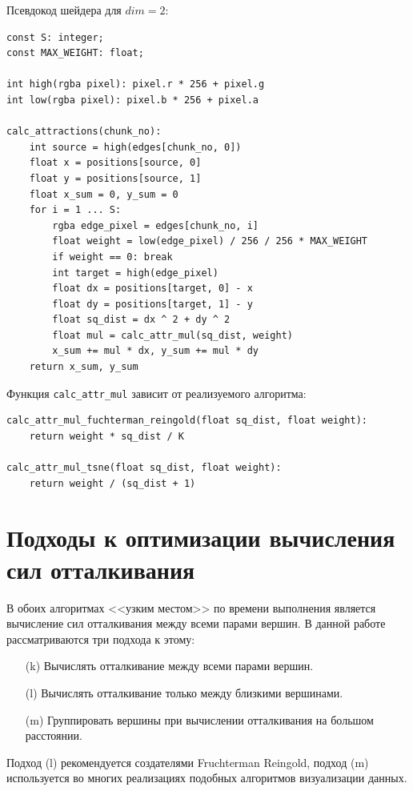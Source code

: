 Псевдокод шейдера для $dim = 2$:

\begin{verbatim}
const S: integer;
const MAX_WEIGHT: float;

int high(rgba pixel): pixel.r * 256 + pixel.g
int low(rgba pixel): pixel.b * 256 + pixel.a

calc_attractions(chunk_no):
    int source = high(edges[chunk_no, 0])
    float x = positions[source, 0]
    float y = positions[source, 1]
    float x_sum = 0, y_sum = 0
    for i = 1 ... S:
        rgba edge_pixel = edges[chunk_no, i]
        float weight = low(edge_pixel) / 256 / 256 * MAX_WEIGHT
        if weight == 0: break
        int target = high(edge_pixel)
        float dx = positions[target, 0] - x
        float dy = positions[target, 1] - y
        float sq_dist = dx ^ 2 + dy ^ 2
        float mul = calc_attr_mul(sq_dist, weight)
        x_sum += mul * dx, y_sum += mul * dy
    return x_sum, y_sum
\end{verbatim}

Функция \texttt{calc\_attr\_mul} зависит от реализуемого алгоритма:

\begin{verbatim}
calc_attr_mul_fuchterman_reingold(float sq_dist, float weight):
    return weight * sq_dist / K

calc_attr_mul_tsne(float sq_dist, float weight):
    return weight / (sq_dist + 1)
\end{verbatim}

\section{Подходы к оптимизации вычисления сил отталкивания}


В обоих алгоритмах <<узким местом>> по времени выполнения является вычисление сил отталкивания между всеми парами вершин. В данной работе рассматриваются три подхода к этому:

\begin{itemize}
\item[(k)] Вычислять отталкивание между всеми парами вершин.
\item[(l)] Вычислять отталкивание только между близкими вершинами.
\item[(m)] Группировать вершины при вычислении отталкивания на большом расстоянии.
\end{itemize}

Подход (l) рекомендуется создателями Fruchterman Reingold, подход (m) используется во многих реализациях подобных алгоритмов визуализации данных.

